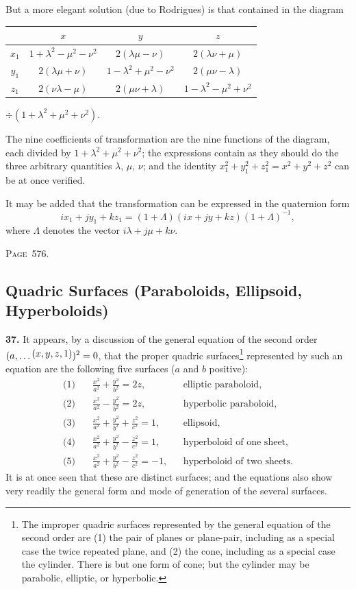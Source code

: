 \documentclass[11pt,a4paper]{article}
\theoremstyle{definition}
\begin{document}
But a more elegant solution (due to Rodrigues) is that contained in the diagram
\begin{center}
\begin{tabular}{c|ccc}
& $x$ & $y$ & $z$ \\
\hline
$x_1$ & $1+\lambda^2-\mu^2-\nu^2$ & $2(\lambda\mu-\nu)$ & $2(\lambda\nu+\mu)$ \\
$y_1$ & $2(\lambda\mu+\nu)$ & $1-\lambda^2+\mu^2-\nu^2$ & $2(\mu\nu-\lambda)$ \\
$z_1$ & $2(\nu\lambda-\mu)$ & $2(\mu\nu+\lambda)$ & $1-\lambda^2-\mu^2+\nu^2$ \\
\end{tabular}
\end{center}
$\div(1+\lambda^2+\mu^2+\nu^2)$.

The nine coefficients of transformation are the nine functions of the diagram, each divided by $1+\lambda^2+\mu^2+\nu^2$; the expressions contain as they should do the three arbitrary quantities $\lambda$, $\mu$, $\nu$; and the identity $x_1^2+y_1^2+z_1^2=x^2+y^2+z^2$ can be at once verified.

It may be added that the transformation can be expressed in the quaternion form
\[
ix_1+jy_1+kz_1=(1+\Lambda)(ix+jy+kz)(1+\Lambda)^{-1},
\]
where $\Lambda$ denotes the vector $i\lambda+j\mu+k\nu$.

\newpage
\noindent\textsc{Page~576.} \subsection*{Quadric Surfaces (Paraboloids, Ellipsoid, Hyperboloids)}

\textbf{37.} It appears, by a discussion of the general equation of the second order $(a,\ldots\,\raisebox{0.5ex}{\text{$\!(x,y,z,1)$}})^2=0$, that the proper quadric surfaces\footnote{The improper quadric surfaces represented by the general equation of the second order are (1) the pair of planes or plane-pair, including as a special case the twice repeated plane, and (2) the cone, including as a special case the cylinder. There is but one form of cone; but the cylinder may be parabolic, elliptic, or hyperbolic.} represented by such an equation are the following five surfaces ($a$ and $b$ positive):
\begin{align*}
\text{(1)}\quad &\frac{x^2}{a^2}+\frac{y^2}{b^2}=2z, && \text{elliptic paraboloid,}\\
\text{(2)}\quad &\frac{x^2}{a^2}-\frac{y^2}{b^2}=2z, && \text{hyperbolic paraboloid,}\\
\text{(3)}\quad &\frac{x^2}{a^2}+\frac{y^2}{b^2}+\frac{z^2}{c^2}=1, && \text{ellipsoid,}\\
\text{(4)}\quad &\frac{x^2}{a^2}+\frac{y^2}{b^2}-\frac{z^2}{c^2}=1, && \text{hyperboloid of one sheet,}\\
\text{(5)}\quad &\frac{x^2}{a^2}+\frac{y^2}{b^2}-\frac{z^2}{c^2}=-1, && \text{hyperboloid of two sheets.}
\end{align*}
It is at once seen that these are distinct surfaces; and the equations also show very readily the general form and mode of generation of the several surfaces.
\end{document}
